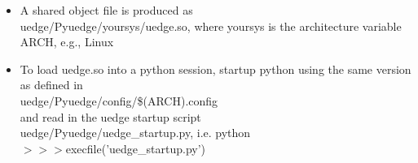 \documentclass [12pt]{article}
\begin{document}
\begin{enumerate}
\begin{enumerate}
\begin{itemize}
          \item A shared object file is produced as \\ uedge/Pyuedge/yoursys/uedge.so,
             where yoursys is the architecture variable ARCH, e.g., Linux
         \item To load uedge.so into a python session, startup python using the same
              version as defined in \\ 
              uedge/Pyuedge/config/\$(ARCH).config \\ 
              and read in the uedge startup script \\ 
              uedge/Pyuedge/uedge\_startup.py, i.e.
                 python \\
             $>>>$execfile('uedge\_startup.py')
         \end{itemize}


\end{enumerate}
\end{enumerate}
\end{document}
